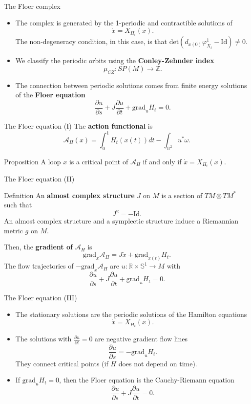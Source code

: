 \documentclass{beamer}
\newcommand{\con}[1]{\mathbb{#1}}
\newcommand{\R}{\con{R}}
\begin{document}
\begin{frame}{The Floer complex}
	\begin{itemize}
		\item The complex is generated by the 1-periodic and contractible solutions of
		\[\dot{x} = X_{H_t}(x) .\]
		The non-degeneracy condition, in this case, is that $\mathrm{det}(d_{x(0)}\varphi_{X_t}^1 - \mathrm{Id}) \neq 0$.
		\item We classify the periodic orbits using the {\bf Conley-Zehnder index}
		\[\mu_{CZ} : SP(M) \longrightarrow \con{Z} .\]
		\item The connection between periodic solutions comes from finite energy solutions of the {\bf Floer equation}
		\[\frac{\partial u}{\partial s} + J \frac{\partial u}{\partial t} + \mathrm{grad}_uH_t = 0 .\]
	\end{itemize}
\end{frame}

\begin{frame}{The Floer equation (I)}
	The {\bf action functional} is
	\[\mathcal{A}_H(x) = \int_0^1 H_t(x(t)) dt - \int_{\con{D}^2} u^{\ast} \omega .\]

	\begin{block}{Proposition}
		A loop $x$ is a critical point of $\mathcal{A}_H$ if and only if $\dot{x} = X_{H_t}(x)$.
	\end{block}
\end{frame}

\begin{frame}{The Floer equation (II)}
	\begin{block}{Definition}
		An {\bf almost complex structure} $J$ on $M$ is a section of $TM\otimes TM^{\ast}$ such that
		\[J^2 = - \mathrm{Id} .\]
		An almost complex structure and a symplectic structure induce a Riemannian metric $g$ on $M$.
	\end{block}

	Then, the {\bf gradient of} $\mathcal{A}_H$ is
	\[\mathrm{grad}_x\mathcal{A}_H = J \dot{x} + \mathrm{grad}_{x(t)}H_t .\]
	The flow trajectories of $- \mathrm{grad}_x\mathcal{A}_H$ are $u : \R \times \con{S}^1 \rightarrow M$ with
	\[\frac{\partial u}{\partial s} + J \frac{\partial u}{\partial t} + \mathrm{grad}_uH_t = 0 .\]
\end{frame}

\begin{frame}{The Floer equation (III)}
	\begin{itemize}
		\item The stationary solutions are the periodic solutions of the Hamilton equations
		\[\dot{x} = X_{H_t}(x) .\]
		\item The solutions with $\frac{\partial u}{\partial t} = 0$ are negative gradient flow lines
		\[\frac{\partial u}{\partial s} = - \mathrm{grad}_uH_t .\]
		They connect critical points (if $H$ does not depend on time).
		\item If $\mathrm{grad}_uH_t = 0$, then the Floer equation is the Cauchy-Riemann equation
		\[\frac{\partial u}{\partial s} + J \frac{\partial u}{\partial t} = 0 .\]
	\end{itemize}
\end{frame}
\end{document}
